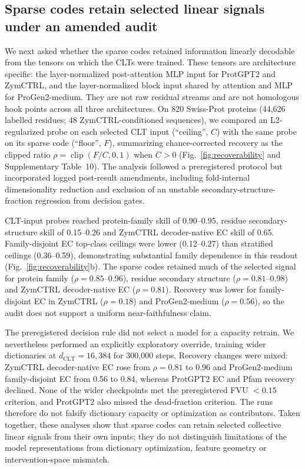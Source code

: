 \documentclass[pdflatex,sn-nature]{sn-jnl}
\begin{document}
\subsection{Sparse codes retain selected linear signals under an amended audit}

We next asked whether the sparse codes retained information linearly decodable from the tensors on which the CLTs were trained. These tensors are architecture specific: the layer-normalized post-attention MLP input for ProtGPT2 and ZymCTRL, and the layer-normalized block input shared by attention and MLP for ProGen2-medium. They are not raw residual streams and are not homologous hook points across all three architectures. On 820 Swiss-Prot proteins (44{,}626 labelled residues; 48 ZymCTRL-conditioned sequences), we compared an L2-regularized probe on each selected CLT input (``ceiling'', $C$) with the same probe on its sparse code (``floor'', $F$), summarizing chance-corrected recovery as the clipped ratio $\rho=\operatorname{clip}(F/C,0,1)$ when $C>0$ (Fig.~\ref{fig:recoverability} and Supplementary Table~10). The analysis followed a preregistered protocol but incorporated logged post-result amendments, including fold-internal dimensionality reduction and exclusion of an unstable secondary-structure-fraction regression from decision gates.

CLT-input probes reached protein-family skill of 0.90--0.95, residue secondary-structure skill of 0.15--0.26 and ZymCTRL decoder-native EC skill of 0.65. Family-disjoint EC top-class ceilings were lower (0.12--0.27) than stratified ceilings (0.36--0.59), demonstrating substantial family dependence in this readout (Fig.~\ref{fig:recoverability}b). The sparse codes retained much of the selected signal for protein family ($\rho=0.85$--0.96), residue secondary structure ($\rho=0.81$--0.98) and ZymCTRL decoder-native EC ($\rho=0.81$). Recovery was lower for family-disjoint EC in ZymCTRL ($\rho=0.18$) and ProGen2-medium ($\rho=0.56$), so the audit does not support a uniform near-faithfulness claim.

The preregistered decision rule did not select a model for a capacity retrain. We nevertheless performed an explicitly exploratory override, training wider dictionaries at $d_\mathrm{CLT}=16{,}384$ for 300{,}000 steps. Recovery changes were mixed: ZymCTRL decoder-native EC rose from $\rho=0.81$ to 0.96 and ProGen2-medium family-disjoint EC from 0.56 to 0.84, whereas ProtGPT2 EC and Pfam recovery declined. None of the wider checkpoints met the preregistered FVU $<0.15$ criterion, and ProtGPT2 also missed the dead-fraction criterion. The runs therefore do not falsify dictionary capacity or optimization as contributors. Taken together, these analyses show that sparse codes can retain selected collective linear signals from their own inputs; they do not distinguish limitations of the model representations from dictionary optimization, feature geometry or intervention-space mismatch.
\end{document}
